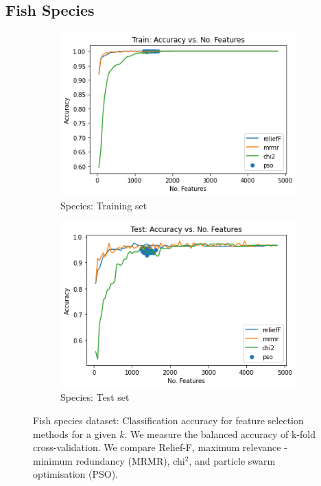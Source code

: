 \documentclass[runningheads]{llncs}
\begin{document}
\subsection{Fish Species}

\begin{figure}[htb]
  \centering
  \begin{subfigure}[b]{.55\linewidth}
    \includegraphics[width=\linewidth]{accuracy-features-fish-train.png}
    \caption{Species: Training set}\label{fig:accuracy-features-fish-train}
  \end{subfigure}
  \begin{subfigure}[b]{.55\linewidth}
    \includegraphics[width=\linewidth]{accuracy-features-fish-test.png}
    \caption{Species: Test set}\label{fig:accuracy-features-fish-test}
  \end{subfigure}
  \caption[Two numerical solutions]{
    Fish species dataset: Classification accuracy for feature selection methods for a given $k$.
    We measure the balanced accuracy of k-fold cross-validation.
    We compare Relief-F, maximum relevance - minimum redundancy (MRMR), chi$^2$, and particle swarm optimisation (PSO).
    }
  \label{fig:animals}
\end{figure}
\end{document}
